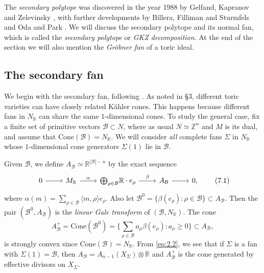 \documentclass{amsart}
\theoremstyle{plain}
\theoremstyle{definition}
\begin{document}
	The {\it secondary polytope\/} was discovered in the year 1988 by
Gelfand, Kapranov and Zelevinsky \cite{GKZ1}, with further developments
by Billera, Filliman and Sturmfels \cite{BFS} and Oda and Park
\cite{OP}.  We will discuss the secondary polytope and its normal
fan, which is called the {\it secondary polytope\/} or {\it GKZ
decomposition\/}.  At the end of the section we will also mention the
{\it Gr\"obner fan\/} of a toric ideal.

	\subsection{The secondary fan} We begin with the
secondary fan, following \cite{OP}.  As noted in \S3, different toric
varieties can have closely related K\"ahler cones.  This happens
because different fans in $N_\mathbb{R}$ can share the same
$1$-dimensional cones.  To study the general case, fix a finite set of
primitive vectors $\mathcal{B} \subset N$, where as usual $N\simeq\mathbb{Z}^n$ and $M$ is its dual, and assume that $\mathrm{Cone}(\mathcal{B}) =
N_\mathbb{R}$.  We will consider {\it all\/} complete fans $\Sigma$ in
$N_\mathbb{R}$ whose $1$-dimensional cone generators $\Sigma(1)$ lie in
$\mathcal{B}$.

	Given $\mathcal{B}$, we define $A_{\mathcal{B}} \simeq \mathbb{R}^{|\mathcal{B}|-n}$ by the exact sequence
\begin{equation}
\begin{tikzcd}
0 \arrow[r] & M_\mathbb{R} \arrow[r, "\alpha"] & {\textstyle{\bigoplus_{\rho \in \mathcal{B}}}}\mathbb{R}\cdot e_\rho \arrow[r, "\beta"] & A_{\mathcal{B}} \arrow[r] & 0,
\end{tikzcd}
\tag{7.1}\label{eq:7.1}
\end{equation}
where $\alpha(m) = \sum_{\rho\in\mathcal{B}} \langle m,\rho\rangle
e_\rho$.  Also let $\mathcal{B}^0 = \{\beta(e_\rho) : \rho \in
\mathcal{B}\} \subset A_{\mathcal{B}}$.  Then the pair
$(\mathcal{B}^0,A_{\mathcal{B}})$ is the {\it linear Gale transform\/} of
$(\mathcal{B}, N_\mathbb{R})$. 
The cone
\[
A^+_{\mathcal{B}} = \mathrm{Cone}(\mathcal{B}^0) = \big\{{\textstyle{\sum_{\rho
\in \mathcal{B}}}} a_\rho \beta(e_\rho) : a_\rho \ge 0\big\}\subset
A_{\mathcal{B}}, 
\]
is strongly convex since $\mathrm{Cone}(\mathcal{B}) = N_\mathbb{R}$.  From
\eqref{eq:2.2}, we see that if $\Sigma$ is a fan with $\Sigma(1) =
\mathcal{B}$, then $A_{\mathcal{B}} =  A_{n-1}(X_\Sigma)\otimes\mathbb{R}$ and
$A^+_{\mathcal{B}}$ is the cone generated by effective divisors on
$X_\Sigma$.
\end{document}
